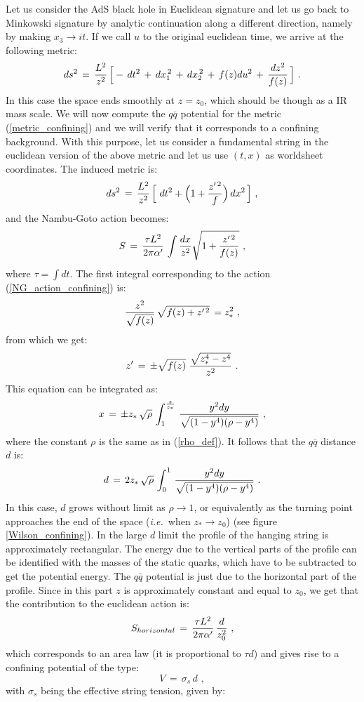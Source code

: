 \documentclass[12pt,notitlepage,a4paper]{article}
\newcommand{\beq}{\begin{equation}}
\newcommand{\eeq}{\end{equation}}
\def\ie{{\emph{i.e.}}}
\begin{document}
Let us consider the AdS black hole in Euclidean signature and let us go back to Minkowski signature by analytic continuation along a different direction, namely by making $x_3\to it$. If we call $u$ to the original euclidean time, we arrive at the following metric:
\beq
ds^2\,=\,{L^2\over z^2}\,\Big[-\,dt^2\,+\,d x_1^{\,2}\,+\,d x_2^{\,2}\,+\,f(z) d u^2\,+\,
{dz^2\over f(z)}\,\Big]\,\,.
\label{metric_confining}
\eeq
In this case the space ends smoothly at $z=z_0$, which should be though as a IR mass scale. We will  now compute the $q\bar q$ potential for the metric (\ref{metric_confining})  and we will verify that it corresponds to a confining background. With this purpose,  let us consider a fundamental string in  the euclidean version of the above metric and let us use $(t,x)$ as worldsheet coordinates. The induced metric is:
\beq
ds^2\,=\,
{L^2\over z^2}\,\Big[\,\,dt^2+\Big(1+{z'^{\,2}\over f}\Big)\,dx^2\,\Big]\,\,,
\eeq
and the Nambu-Goto action becomes:
\beq
S\,=\,{\tau L^2\over 2\pi\alpha'}\,\int {dx \over z^2}
\sqrt{1+{z'^{\,2}\over f(z)}}\,\,,
\label{NG_action_confining}
\eeq
where $\tau=\int dt$. The first integral corresponding to the action (\ref{NG_action_confining})  is:
\beq
{z^2\over\sqrt{ f(z)}}\,\sqrt{f(z)+z'^{\,2}}\,=z_*^2\,\,,
\eeq
from which we get:
\beq
z'\,=\,\pm \sqrt{f(z)}\,\,
{\sqrt{z_*^4-z^4}\over z^2}\,\,.
\eeq
This equation can be integrated as:
\beq
x\,=\,\pm z_*\,\sqrt{\rho}\,
\int_{1}^{{z\over z_*}}\,
{y^2 dy\over \sqrt{(1-y^4)(\rho-y^4)}}\,\,,
\eeq
where the constant $\rho$ is the same as in (\ref{rho_def}). It follows that the $q\bar q$ distance $d$ is:
\beq
d\,=\,2 z_*\,\sqrt{\rho}\,
\int_{0}^{1}\,
{y^2 dy\over \sqrt{(1-y^4)(\rho-y^4)}}\,\,.
\eeq
In this case, $d$ grows without limit as $\rho\to 1$, or equivalently as the turning point approaches the end of the space (\ie\ when $z_*\to z_0$) (see figure \ref{Wilson_confining}). In the large $d$ limit the profile of the hanging string is approximately rectangular. The  energy due to the vertical parts of the profile can be identified with the masses of the static quarks, which have to be subtracted to get the potential energy.  The $q\bar q$ potential is just due to the horizontal part of the profile. Since in this part $z$ is approximately constant and equal to 
$z_0$, we get that the contribution to the euclidean action is:
\beq
S_{horizontal}\,=\,{\tau L^2\over 2\pi\alpha'}\,{d\over z_0^2}\,\,,
\eeq
which corresponds to an area law (it is proportional to $\tau d$) and gives rise to a confining potential of the type:
\beq
V\,=\,\sigma_s\,d\,\,,
\eeq
with $\sigma_s$ being the effective string tension, given by:
\end{document}
